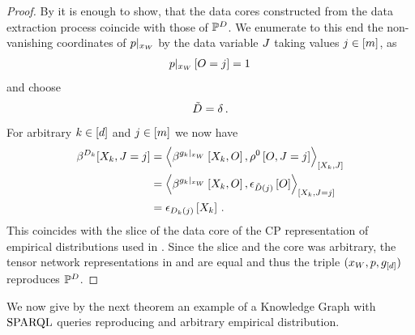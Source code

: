 \begin{proof}
    By  it is enough to show, that the data cores constructed from the data extraction process coincide with those of $\mathbb{P}^{D}$.
    We enumerate to this end the non-vanishing coordinates of ${p}|_{x_{W}}$ by the data variable $J$ taking values $j\in[m]$, as
    \begin{align*}
        {p}|_{x_{W}} \left[O=j\right] = 1 \,
    \end{align*}
    and choose
    \begin{align*}
        \tilde{D} = \delta \, .
    \end{align*}
    For arbitrary $k\in[d]$ and $j\in[m]$ we now have
    \begin{align*}
        \datacoreofat{\atomenumerator}{\catvariableof{\catenumerator},\indexeddatvariable}
        &= \contractionof{
            \bencodingofat{\groundingof{\extformulaof{\atomenumerator}}}{\catvariableof{\catenumerator},\indvariable},
            \legcoreofat{0}{\indvariable,\indexeddatvariable}
        }{\catvariableof{\atomenumerator},\datvariable} \\
        &= \contractionof{
            \bencodingofat{\groundingof{\extformulaof{\atomenumerator}}}{\catvariableof{\catenumerator},\indvariable},
            \onehotmapofat{\secdatamap(\datindex)}{\indvariable}
        }{\catvariableof{\atomenumerator},\indexeddatvariable} \\
        &= \onehotmapofat{\datamap_\atomenumerator(\datindex)}{\catvariableof{\catenumerator}} \, .
    \end{align*}
    This coincides with the slice of the data core of the CP representation of empirical distributions used in .
    Since the slice and the core was arbitrary, the tensor network representations in  and  are equal and thus the triple $(x_{W},p,g_{[d]})$ reproduces $\mathbb{P}^{D}$.
\end{proof}


We now give by the next theorem an example of a Knowledge Graph with $\mathrm{SPARQL}$ queries reproducing and arbitrary empirical distribution.

